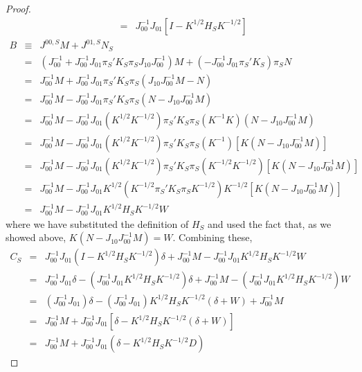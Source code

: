 \documentclass[12pt]{article}
\theoremstyle{definition}
\begin{document}
\begin{proof}
\begin{eqnarray*}
			&=&J_{00}^{-1}J_{01}\left[ I -  K^{1/2}H_SK^{-1/2}\right]
	\end{eqnarray*}
	\begin{eqnarray*}
		B &\equiv&  J^{00,S}M + J^{01,S} N_S\\
			&=& \left(J_{00}^{-1} + J_{00}^{-1}J_{01}\pi_S'K_S\pi_S J_{10}J_{00}^{-1}\right) M + \left( -J_{00}^{-1}J_{01}\pi_S'K_S\right) \pi_S N\\
			&=& J_{00}^{-1}M  + J_{00}^{-1}J_{01}\pi_S'K_S\pi_S\left( J_{10}J_{00}^{-1}M - N\right)  \\
			&=& J_{00}^{-1}M  - J_{00}^{-1}J_{01}\pi_S'K_S\pi_S\left(N - J_{10}J_{00}^{-1}M\right)  \\
			&=& J_{00}^{-1}M  - J_{00}^{-1}J_{01}\left(K^{1/2}K^{-1/2}\right)\pi_S'K_S\pi_S\left(K^{-1}K\right)\left(N - J_{10}J_{00}^{-1}M\right)  \\
			&=& J_{00}^{-1}M  - J_{00}^{-1}J_{01}\left(K^{1/2}K^{-1/2}\right)\pi_S'K_S\pi_S\left(K^{-1}\right)\left[K\left(N - J_{10}J_{00}^{-1}M\right)\right]  \\
			&=& J_{00}^{-1}M  - J_{00}^{-1}J_{01}\left(K^{1/2}K^{-1/2}\right)\pi_S'K_S\pi_S\left(K^{-1/2}K^{-1/2}\right)\left[K\left(N - J_{10}J_{00}^{-1}M\right)\right]  \\
			&=& J_{00}^{-1}M  - J_{00}^{-1}J_{01}K^{1/2}\left(K^{-1/2}\pi_S'K_S\pi_SK^{-1/2}\right)K^{-1/2}\left[K\left(N - J_{10}J_{00}^{-1}M\right)\right]  \\
			&=& J_{00}^{-1}M  - J_{00}^{-1}J_{01}K^{1/2}H_SK^{-1/2}W 
	\end{eqnarray*}
where we have substituted the definition of $H_S$ and  used the fact that, as we showed above, $K(N - J_{10}J_{00}^{-1}M) = W$. Combining these, 
	\begin{eqnarray*}
	C_S &=& J_{00}^{-1}J_{01}\left( I -  K^{1/2}H_SK^{-1/2}\right) \delta + J_{00}^{-1}M  - J_{00}^{-1}J_{01}K^{1/2}H_SK^{-1/2}W \\
		&=& J_{00}^{-1}J_{01}\delta -  \left(J_{00}^{-1}J_{01}K^{1/2}H_SK^{-1/2}\right)\delta + J_{00}^{-1}M  - \left(J_{00}^{-1}J_{01}K^{1/2}H_SK^{-1/2}\right)W \\
		&=& \left(J_{00}^{-1}J_{01}\right)\delta -  \left(J_{00}^{-1}J_{01}\right)K^{1/2}H_SK^{-1/2}(\delta+W) + J_{00}^{-1}M \\
		&=& J_{00}^{-1}M + J_{00}^{-1}J_{01}\left[\delta -  K^{1/2}H_SK^{-1/2}(\delta+W)\right]\\
		&=& J_{00}^{-1}M + J_{00}^{-1}J_{01}\left(\delta -  K^{1/2}H_SK^{-1/2}D\right)
\end{eqnarray*}

\end{proof}
\end{document}
